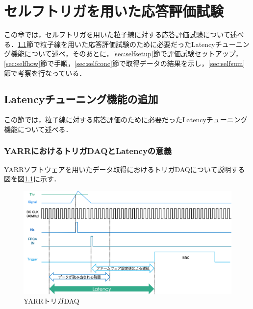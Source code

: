 \chapter{セルフトリガを用いた応答評価試験}
この章では，セルフトリガを用いた粒子線に対する応答評価試験について述べる．\ref{sec:latency}節で粒子線を用いた応答評価試験のために必要だったLatencyチューニング機能について述べ，そのあとに，\ref{sec:selfsetup}節で評価試験セットアップ，\ref{sec:selfhow}節で手順，\ref{sec:selfconc}節で取得データの結果を示し，\ref{sec:selfsum}節で考察を行なっている．

\section{Latencyチューニング機能の追加}
\label{sec:latency}
この節では，粒子線に対する応答評価のために必要だったLatencyチューニング機能について述べる．
\subsection{YARRにおけるトリガDAQとLatencyの意義}
YARRソフトウェアを用いたデータ取得におけるトリガDAQについて説明する図を図\ref{fig:YARRDAQ}に示す．\par
\begin{figure}[h]
  \centering
  \includegraphics[width=15cm]{./figure/DAQ_signal.png}
  \caption{YARRトリガDAQ}
  \label{fig:YARRDAQ}
\end{figure}

